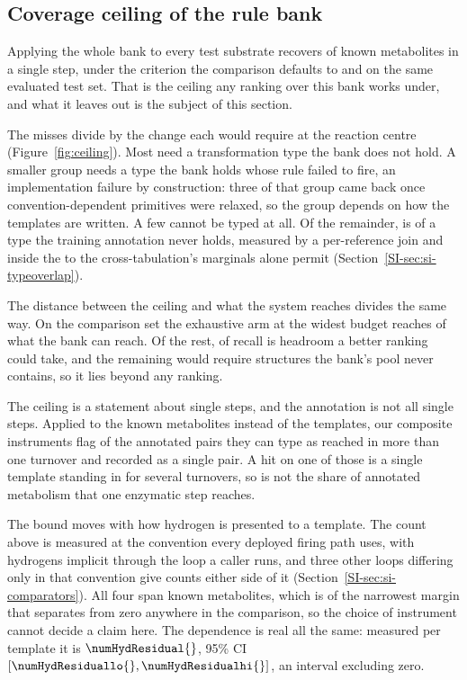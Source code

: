 \subsection{Coverage ceiling of the rule bank}
\label{sec:ceiling}

Applying the whole bank to every test substrate recovers \numCeilingCoverage{} of known metabolites
in a single step, under the criterion the comparison defaults to and on the same evaluated test
set. That is the ceiling any ranking over this bank works under, and what it leaves out is the
subject of this section.

The misses divide by the change each would require at the reaction centre
(Figure~\ref{fig:ceiling}). Most need a transformation type the bank does not hold. A smaller group
needs a type the bank holds whose rule failed to fire, an implementation failure by construction:
three of that group came back once convention-dependent primitives were relaxed, so the group
depends on how the templates are written. A few cannot be typed at all. Of the remainder,
\numContainmentShortfallsharePct{} is of a type the training annotation never holds, measured by a
per-reference join and inside the \numBoundShortfallshareminPct{} to
\numBoundShortfallsharemaxPct{} the cross-tabulation's marginals alone permit
(Section~\ref{SI-sec:si-typeoverlap}).

The distance between the ceiling and what the system reaches divides the same way. On the
comparison set the exhaustive arm at the widest budget reaches \numHeadroomSharePct{} of what the
bank can reach. Of the rest, \numHeadroomRanking{} of recall is headroom a better ranking could
take, and the remaining \numHeadroomCoverage{} would require structures the bank's pool never
contains, so it lies beyond any ranking.

The ceiling is a statement about single steps, and the annotation is not all single steps. Applied
to the known metabolites instead of the templates, our composite instruments flag
\numRefstepEithersharePct{} of the annotated pairs they can type as reached in more than one
turnover and recorded as a single pair. A hit on one of those is a single template standing in for several turnovers, so
\numCeilingCoverage{} is not the share of annotated metabolism that one enzymatic step reaches.

The bound moves with how hydrogen is presented to a template. The count above is measured at the
convention every deployed firing path uses, with hydrogens implicit through the loop a caller runs,
and three other loops differing only in that convention give counts either side of it
(Section~\ref{SI-sec:si-comparators}). All four span \numCeilagreeSpread{} known metabolites, which
is \numCeilagreeSpreadofmarginPct{} of the narrowest margin that separates from zero anywhere in
the comparison, so the choice of instrument cannot decide a claim here. The dependence is real all
the same: measured per template it is $\numHydResidual{}$, 95\% CI $[\numHydResiduallo{},
\numHydResidualhi{}]$, an interval excluding zero.

